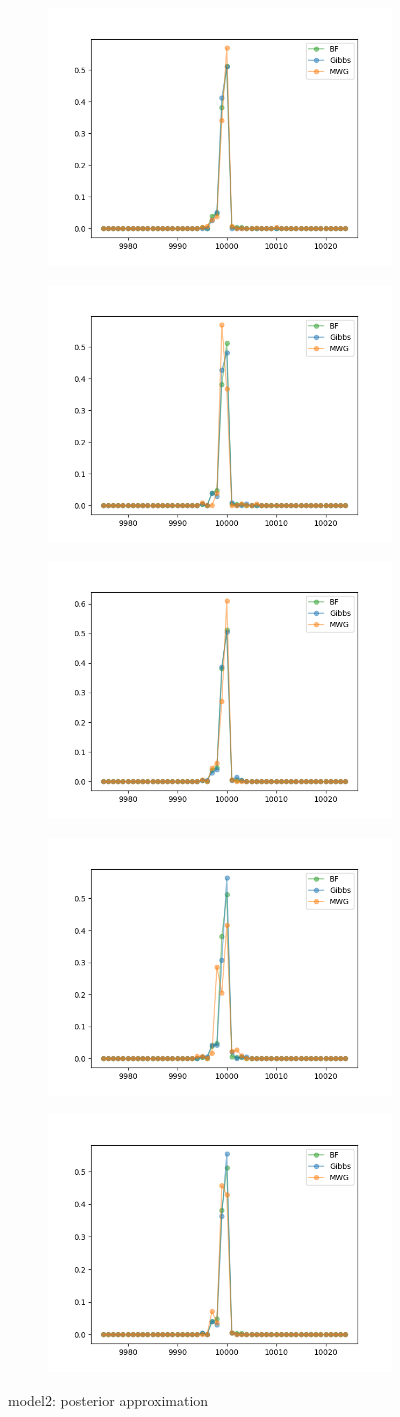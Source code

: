 \begin{figure}[H]
    \centering
    \begin{subfigure}
    	\centering
        \includegraphics[width=0.3\linewidth]{../../plots/Posterior_post_burnin_M2_N20000_NMCMC3_seed0_diffind2.png}
    \end{subfigure}
    \begin{subfigure}
        \centering
    	\includegraphics[width=0.3\linewidth]{../../plots/Posterior_post_burnin_M2_N20000_NMCMC3_seed1_diffind2.png}
	\end{subfigure}
	\begin{subfigure}
	    \centering
    	\includegraphics[width=0.3\linewidth]{../../plots/Posterior_post_burnin_M2_N20000_NMCMC3_seed2_diffind2.png}
	\end{subfigure}
	\begin{subfigure}
	    \centering
    	\includegraphics[width=0.3\linewidth]{../../plots/Posterior_post_burnin_M2_N20000_NMCMC3_seed3_diffind2.png}
	\end{subfigure}
	\begin{subfigure}
	    \centering
    	\includegraphics[width=0.3\linewidth]{../../plots/Posterior_post_burnin_M2_N20000_NMCMC3_seed4_diffind2.png}
	\end{subfigure}
	\caption{model2: posterior approximation}
\end{figure}

